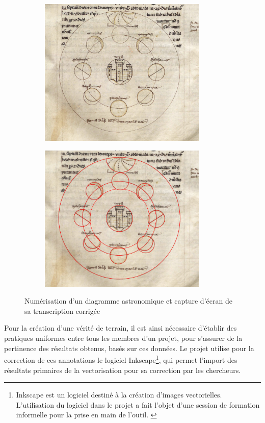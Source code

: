     \begin{figure}[h]
    	\begin{subfigure}{0.5\linewidth}
    		\centering
    		\includegraphics[width=8cm]{images/diagram8.png}
    	\end{subfigure}
    	\hspace{1pt}
    	\begin{subfigure}{0.5\linewidth}
    		\centering
    		\includegraphics[width=8cm]{images/diagram8_corr.png}
    	\end{subfigure}
    	\hspace{1pt}
    	\caption{Numérisation d'un diagramme astronomique et capture d'écran de sa transcription corrigée}
    	\label{fig:diagram_svg}
    \end{figure}

	Pour la création d'une vérité de terrain, il est ainsi nécessaire d'établir des pratiques uniformes entre tous les membres d'un projet, pour s'assurer de la pertinence des résultats obtenus, basés sur ces données. Le projet \eida utilise pour la correction de ces annotations le logiciel Inkscape\footnote{Inkscape est un logiciel destiné à la création d'images vectorielles. L'utilisation du logiciel dans le projet \eida a fait l'objet d'une session de formation informelle pour la prise en main de l'outil. \cite{Inkscape}}, qui permet l'import des résultats primaires de la vectorisation pour sa correction par les chercheurs. 
	
